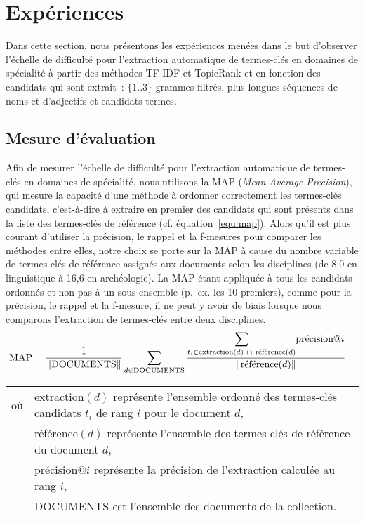\section{Expériences}
\label{sec:experiences}
  Dans cette section, nous présentons les expériences menées dans le but
  d'observer l'échelle de difficulté pour l'extraction automatique de
  termes-clés en domaines de spécialité à partir des méthodes TF-IDF et
  TopicRank et en fonction des candidats qui sont extrait~: $\{1..3\}$-grammes
  filtrés, plus longues séquences de noms et d'adjectifs et candidats termes.

  \subsection{Mesure d'évaluation}
  \label{subsec:mesure_d_evaluation}
    Afin de mesurer l'échelle de difficulté pour l'extraction automatique de
    termes-clés en domaines de spécialité, nous utilisons la MAP (\textit{Mean
    Average Precision}), qui mesure la capacité d'une méthode à ordonner
    correctement les termes-clés candidats, c'est-à-dire à extraire en premier des
    candidats qui sont présents dans la liste des termes-clés de référence (cf.
    équation~\ref{equ:map}). Alors qu'il est plus courant d'utiliser la
    précision, le rappel et la f-mesures pour comparer les méthodes entre elles,
    notre choix se porte sur la MAP à cause du nombre variable de termes-clés de
    référence assignés aux documents selon les disciplines (de 8,0 en
    linguistique à 16,6 en archéologie). La MAP étant appliquée à tous les
    candidats ordonnés et non pas à un sous ensemble (p.~ex. les 10 premiers),
    comme pour la précision, le rappel et la f-mesure, il ne peut y avoir de
    biais lorsque nous comparons l'extraction de termes-clés entre deux
    disciplines.
    \begin{align}
      \text{MAP} &= \frac{1}{\|\text{DOCUMENTS}\|} \sum_{d \in \text{DOCUMENTS}} \frac{\mathlarger\sum_{t_i \in \text{extraction}(d)~\cap~\text{référence}(d)} \text{précision}@i}{\|\text{référence}(d)\|} \label{equ:map}
    \end{align}
    \hfill\begin{minipage}{.824\linewidth}
      \begin{tabular}{@{}l@{~~-~~}p{.9\linewidth}@{}}
        où & extraction$(d)$ représente l'ensemble ordonné des termes-clés
             candidats $t_i$ de rang $i$ pour le document $d$,\\
           & référence$(d)$ représente l'ensemble des termes-clés de référence
             du document $d$,\\
           & précision$@i$ représente la précision de l'extraction calculée au
             rang $i$,\\
           & DOCUMENTS est l'ensemble des documents de la collection. \\
      \end{tabular}
    \end{minipage}
    
